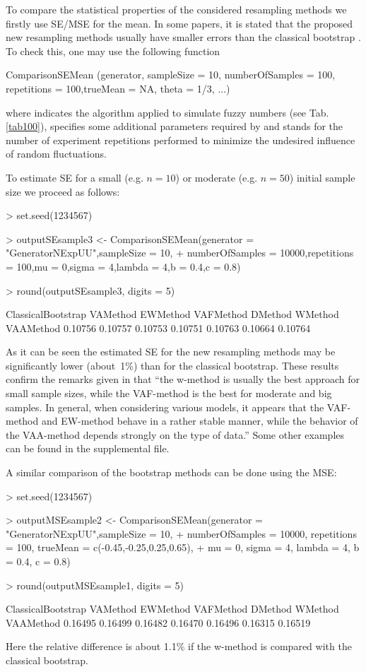 To compare the statistical properties of the considered resampling methods we firstly use SE/MSE for the mean. In some papers, it is stated that the proposed new resampling methods  usually have smaller errors than the classical bootstrap \citep{grzegorzewski_amcs2020,grzegorzewski_ijcis2020,GrzegorzewskiRom2021}. To check this, one may use the following  function
\begin{example}
ComparisonSEMean (generator, sampleSize = 10, numberOfSamples = 100,
  repetitions = 100,trueMean = NA, theta = 1/3, ...)
\end{example}
where  indicates the algorithm applied to simulate fuzzy numbers (see Tab. \ref{tab100}),  specifies some additional parameters required by  and  stands for the number of experiment repetitions performed to minimize the undesired influence of random fluctuations. 

To estimate SE for a small (e.g. $n=10$) or moderate (e.g. $n=50$) initial sample size we proceed as follows:
\begin{example}
> set.seed(1234567)

> outputSEsample3 <- ComparisonSEMean(generator = "GeneratorNExpUU",sampleSize = 10,
+ numberOfSamples = 10000,repetitions = 100,mu = 0,sigma = 4,lambda = 4,b = 0.4,c = 0.8)

> round(outputSEsample3, digits = 5)

ClassicalBootstrap  VAMethod  EWMethod  VAFMethod  DMethod  WMethod VAAMethod
           0.10756   0.10757   0.10753    0.10751  0.10763  0.10664  0.10764
\end{example}
As it can be seen the estimated SE for the new resampling methods may be significantly lower (about~1{\%}) than for the classical bootstrap.
These results confirm the remarks given in \cite{GrzegorzewskiRom2021} that ``the w-method is usually the best approach for small sample sizes, while the VAF-method is the best for moderate and big samples. In general, when considering various models, it appears that the VAF-method and EW-method behave in a rather stable manner, while the behavior of the VAA-method depends strongly on the type of data.'' Some other examples can be found in the supplemental file.

A similar comparison of the bootstrap methods can be done using the MSE:
\begin{example}
> set.seed(1234567)

> outputMSEsample2 <- ComparisonSEMean(generator = "GeneratorNExpUU",sampleSize = 10,
+ numberOfSamples = 10000, repetitions = 100, trueMean = c(-0.45,-0.25,0.25,0.65),
+ mu = 0, sigma = 4, lambda = 4, b = 0.4, c = 0.8)

> round(outputMSEsample1, digits = 5)

ClassicalBootstrap  VAMethod  EWMethod  VAFMethod  DMethod  WMethod  VAAMethod 
           0.16495   0.16499   0.16482    0.16470  0.16496   0.16315  0.16519
\end{example}
Here the relative difference is about 1.1{\%} if the w-method is compared with the classical bootstrap.


